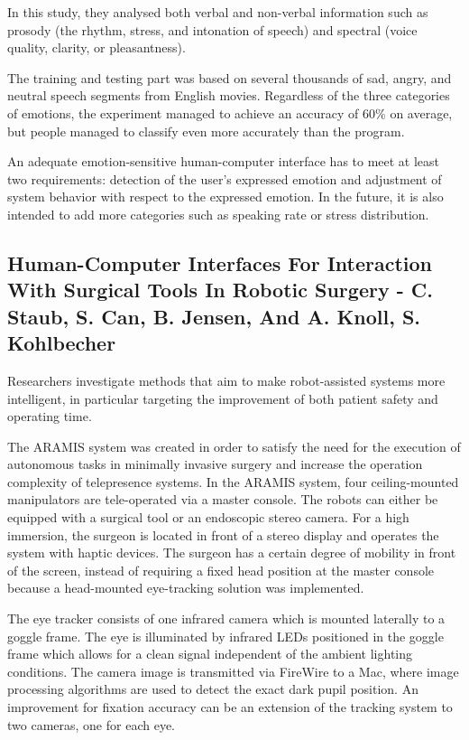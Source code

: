 \documentclass[12pt, twoside]{article}
\begin{document}
In this study, they analysed both verbal and non-verbal information such as prosody (the rhythm, stress, and intonation of speech) and spectral (voice quality, clarity, or pleasantness).

The training and testing part was based on several thousands of sad, angry, and neutral speech segments from English movies. Regardless of the three categories of emotions, the experiment managed to achieve an accuracy of 60\% on average, but people managed to classify even more accurately than the program. 

An adequate emotion-sensitive human-computer interface has to meet at least two requirements: detection of the user’s expressed emotion and adjustment of system behavior with respect to the expressed emotion. In the future, it is also intended to add more categories such as speaking rate or stress distribution.

\subsection{Human-Computer Interfaces For Interaction With Surgical Tools In Robotic Surgery - C. Staub, S. Can, B. Jensen, And A. Knoll, S. Kohlbecher\cite{3}}
Researchers investigate methods that aim to make robot-assisted systems more intelligent, in particular targeting the improvement of both patient safety and operating time.

The ARAMIS system was created in order to satisfy the need for the execution of autonomous tasks in minimally invasive surgery and increase the operation complexity of telepresence systems. In the ARAMIS system, four ceiling-mounted manipulators are tele-operated via a master console. The robots can either be equipped with a surgical tool or an endoscopic stereo camera. For a high immersion, the surgeon is located in front of a stereo display and operates the system with haptic devices. The surgeon has a certain degree of mobility in front of the screen, instead of requiring a fixed head position at the master console because a head-mounted eye-tracking solution was implemented.

The eye tracker consists of one infrared camera which is mounted laterally to a goggle frame. The eye is illuminated by infrared LEDs positioned in the goggle frame which allows for a clean signal independent of the ambient lighting conditions. The camera image is transmitted via FireWire to a Mac, where image processing algorithms are used to detect the exact dark pupil position. An improvement for fixation accuracy can be an extension of the tracking system to two cameras, one for each eye.
\end{document}
